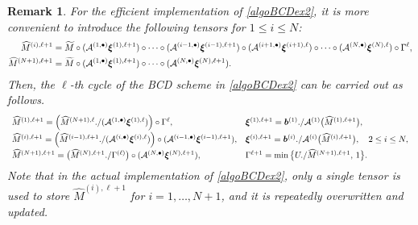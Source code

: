 \documentclass[10pt]{article}
\newcommand{\cA}{{\cal A}}
\newtheorem{remark}{Remark}
\begin{document}
\begin{remark}
For the efficient implementation of \eqref{algoBCDex2}, it is more convenient to introduce the following tensors for  $1\leq i\leq N$:
\begin{equation*}
\begin{aligned}
\widehat{M}^{(i),\ell+1} &=  \widetilde{M}\circ (\cA^{(1,\bullet)}\bm{\xi}^{(1),\ell+1})\circ\dots \circ (\cA^{(i-1,\bullet)}\bm{\xi}^{(i-1),\ell+1})\circ (\cA^{(i+1,\bullet)}\bm{\xi}^{(i+1),\ell}) \circ \dots \circ (\cA^{(N,\bullet)}\bm{\xi}^{(N),\ell})\circ \Gamma^\ell, \\
\widehat{M}^{(N+1),\ell+1} &=  \widetilde{M}\circ (\cA^{(1,\bullet)}\bm{\xi}^{(1),\ell+1})\circ\dots \circ (\cA^{(N,\bullet)}\bm{\xi}^{(N),\ell+1}).
\end{aligned}
\end{equation*}
Then, the $\ell$-th cycle of the BCD scheme in \eqref{algoBCDex2} can be carried out as follows.
\begin{equation*}
\begin{array}{ll}
\widehat{M}^{(1),\ell+1} = \Big(\widehat{M}^{(N+1),\ell} ./ (\cA^{(1,\bullet)}\bm{\xi}^{(1),\ell})\Big)\circ\Gamma^{\ell},
&\bm{\xi}^{(1),\ell+1} = \bm{b}^{(1)}./ \cA^{(1)} \big(\widehat{M}^{(1),\ell+1}\big),\\ [5pt]
\widehat{M}^{(i),\ell+1} = \Big(\widehat{M}^{(i-1),\ell+1} ./ (\cA^{(i,\bullet)}\bm{\xi}^{(i),\ell})\Big) \circ (\cA^{(i-1,\bullet)}\bm{\xi}^{(i-1),\ell+1}),
&\bm{\xi}^{(i),\ell+1} = \bm{b}^{(i)}./ \cA^{(i)} \big(\widehat{M}^{(i),\ell+1}\big),  \quad 2\leq i\leq N, \\ [5pt]
\widehat{M}^{(N+1),\ell+1} = \big(\widehat{M}^{(N),\ell+1} ./ \Gamma^{(\ell)} \big)\circ (\cA^{(N,\bullet)}\bm{\xi}^{(N),\ell+1}),
&\Gamma^{\ell+1} = \min\big\{ U./\widehat{M}^{(N+1),\ell+1}, \,1 \big\}.
\end{array}
\end{equation*}
Note that in the actual implementation of \eqref{algoBCDex2}, only a single  tensor is used to  store $\widehat{M}^{(i),\ell+1}$ for $i=1,\dots,N+1$, and it is repeatedly overwritten and updated.
\end{remark}
\end{document}
